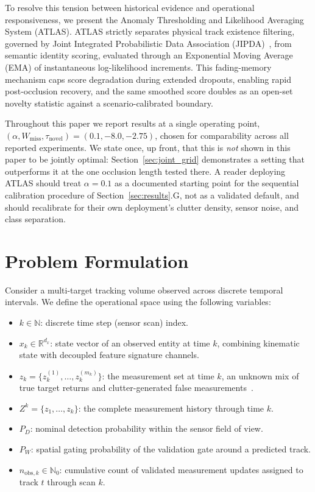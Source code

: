 \documentclass[conference]{IEEEtran}
\begin{document}
To resolve this tension between historical evidence and operational responsiveness, we present the Anomaly Thresholding and Likelihood Averaging System (ATLAS). ATLAS strictly separates physical track existence filtering, governed by Joint Integrated Probabilistic Data Association (JIPDA)~\cite{musicki_2002_joint}, from semantic identity scoring, evaluated through an Exponential Moving Average (EMA) of instantaneous log-likelihood increments. This fading-memory mechanism caps score degradation during extended dropouts, enabling rapid post-occlusion recovery, and the same smoothed score doubles as an open-set novelty statistic against a scenario-calibrated boundary.

Throughout this paper we report results at a single operating point, $(\alpha, W_{\text{miss}}, \tau_{\text{novel}}) = (0.1, -8.0, -2.75)$, chosen for comparability across all reported experiments. We state once, up front, that this is \emph{not} shown in this paper to be jointly optimal: Section~\ref{sec:joint_grid} demonstrates a setting that outperforms it at the one occlusion length tested there. A reader deploying ATLAS should treat $\alpha=0.1$ as a documented starting point for the sequential calibration procedure of Section~\ref{sec:results}.G, not as a validated default, and should recalibrate for their own deployment's clutter density, sensor noise, and class separation.

\section{Problem Formulation}
\label{sec:formulation}
Consider a multi-target tracking volume observed across discrete temporal intervals. We define the operational space using the following variables:

\begin{itemize}
    \item $k \in \mathbb{N}$: discrete time step (sensor scan) index.
    \item $x_k \in \mathbb{R}^{d_x}$: state vector of an observed entity at time $k$, combining kinematic state with decoupled feature signature channels.
    \item $z_k = \{z_k^{(1)}, \dots, z_k^{(m_k)}\}$: the measurement set at time $k$, an unknown mix of true target returns and clutter-generated false measurements~\cite{pei_2019_an}.
    \item $Z^k = \{z_1, \dots, z_k\}$: the complete measurement history through time $k$.
    \item $P_D$: nominal detection probability within the sensor field of view.
    \item $P_W$: spatial gating probability of the validation gate around a predicted track.
    \item $n_{\text{obs},k} \in \mathbb{N}_0$: cumulative count of validated measurement updates assigned to track $t$ through scan $k$.
\end{itemize}
\end{document}
